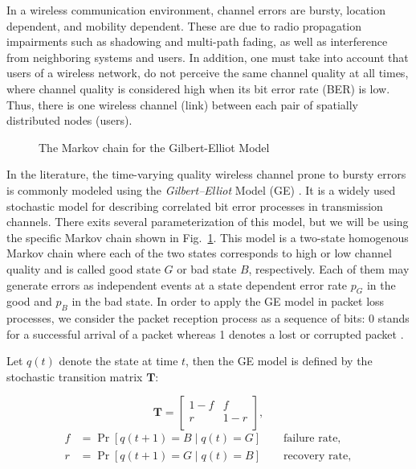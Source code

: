In a wireless communication environment, channel errors are bursty, location
dependent, and mobility dependent. These are due to radio propagation
impairments such as shadowing and multi-path fading, as well as interference
from neighboring systems and users. In addition, one must take into account that
users of a wireless network, do not perceive the same channel quality at all
times, where channel quality is considered high when its bit error rate (BER) is
low. Thus, there is one wireless channel (link) between each pair of spatially
distributed nodes (users). 

\begin{figure}[htb]
  \centering
   
  \caption{The Markov chain for the Gilbert-Elliot Model}
  \label{fig:GE_FSM}
\end{figure}

In the literature, the time-varying quality wireless channel prone to bursty
errors is commonly modeled using the \textit{Gilbert–Elliot} Model (GE)
\cite{gilbert1960capacity, elliott1963estimates}. It is a widely used stochastic
model for describing correlated bit error processes in transmission channels.
There exits several parameterization of this model, but we will be using the
specific Markov chain shown in Fig.~\ref{fig:GE_FSM}. This model is a two-state
homogenous Markov chain where each of the two states corresponds to high or low
channel quality and is called good state $G$ or bad state $B$, respectively.
Each of them may generate errors as independent events at a state dependent
error rate $p_G$ in the good and $p_B$ in the bad state. In order to apply the
GE model in packet loss processes, we consider the packet reception process as a
sequence of bits: 0 stands for a successful arrival of a packet whereas 1
denotes a lost or corrupted packet \cite{hasslinger2008gilbert}.

Let $q(t)$ denote the state at time $t$, then the GE model is defined by the
stochastic transition matrix $\boldsymbol{T}$:

\begin{equation}
  \label{eq:GE_transition}
  \boldsymbol{T} = 
  \begin{bmatrix}
    1-f & f \\
    r & 1-r \\
  \end{bmatrix},
\end{equation}
\begin{align}
  f &= \Pr[q(t+1) = B \mid q(t) = G] \qquad \textrm{failure rate}, \\
  r &= \Pr[q(t+1) = G \mid q(t) = B] \qquad \textrm{recovery rate},
\end{align}

